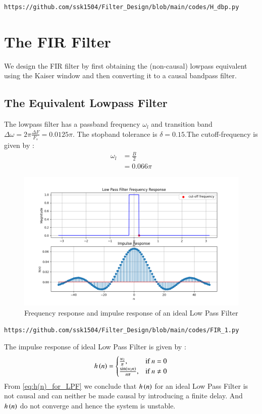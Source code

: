 \documentclass{article}
\begin{document}
\begin{lstlisting}
https://github.com/ssk1504/Filter_Design/blob/main/codes/H_dbp.py
\end{lstlisting}


\section{The FIR Filter}
We design the FIR filter by first obtaining the (non-causal) lowpass equivalent using the Kaiser window
and then
converting it to a causal bandpass filter.
\subsection{The Equivalent Lowpass Filter}
The lowpass filter has a passband frequency $\omega_l$ and transition band $\Delta \omega = 2\pi \frac{\Delta F}{F_s} = 0.0125\pi$.
The stopband tolerance is $\delta=0.15$.The cutoff-frequency is given by :
\begin{align}
    \omega_{l} &= \frac{B}{2}\\
                &= 0.066\pi
\end{align}
\begin{figure}[H]
\centering
\includegraphics[width=1\columnwidth]{figs/LPF_FIR.png}
\caption{Frequency response and impulse response of an ideal Low Pass Filter}
\label{fig:LPF_FIR_1}
\end{figure}


\begin{lstlisting}
https://github.com/ssk1504/Filter_Design/blob/main/codes/FIR_1.py
\end{lstlisting}

The impulse response of ideal Low Pass Filter is given by :
\begin{align}
    h\left(n\right) = 
\begin{cases} 
    \frac{w_l}{\pi}, & \text{if } n = 0 \\
    \frac{\sin(w_l n)}{n\pi}, & \text{if } n \neq 0
\end{cases} \label{eq:h(n)_for_LPF}
\end{align}
From \eqref{eq:h(n)_for_LPF} we conclude that $h\left(n\right)$ for an ideal Low Pass Filter is not causal and can neither be made causal by introducing a finite delay. And $h\left(n\right)$ do not converge and hence the system is unstable.
\end{document}
